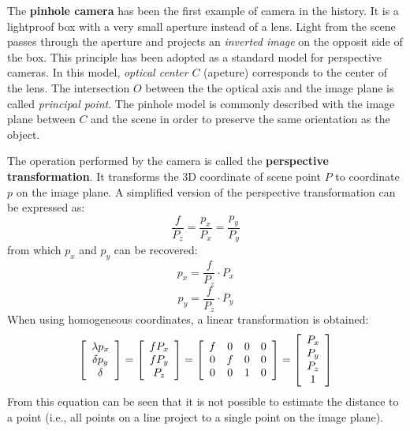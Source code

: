 {The \textbf{pinhole camera} has been the first example of camera in the history.
It is a lightproof box with a very small aperture instead of a lens.
Light from the scene passes through the aperture and projects an \textit{inverted image} on the opposit side of the box.
This principle has been adopted as a standard model for perspective cameras.
In this model, \textit{optical center} $C$ (apeture) corresponds to the center of the lens.
The intersection $O$ between the the optical axis and the image plane is called \textit{principal point}.
The pinhole model is commonly described with the image plane between $C$ and the scene in order to preserve the same orientation as the object.

The operation performed by the camera is called the \textbf{perspective transformation}.
It transforms the 3D coordinate of scene point $P$ to coordinate $p$ on the image plane.
A simplified version of the perspective transformation can be expressed as:
\begin{equation}
\frac{f}{P_z} = \frac{p_x}{P_x} = \frac{p_y}{P_y}
\end{equation}
from which $p_x$ and $p_y$ can be recovered:
\begin{equation}
p_x = \frac{f}{P_z} \cdot P_x
\end{equation}
\begin{equation}
p_y = \frac{f}{P_z} \cdot P_y
\end{equation}
When using homogeneous coordinates, a linear transformation is obtained:
\begin{equation}
\left[ \begin{array}{c}
\lambda p_x \\
\delta p_y \\
\delta
\end{array} \right]
=
\left[ \begin{array}{c}
f P_x \\
f P_y \\
P_z
\end{array} \right]
=
\left[ \begin{array}{c c c c}
f & 0 & 0 & 0  \\
0 & f & 0 & 0 \\
0 & 0 & 1 & 0
\end{array} \right]
=
\left[ \begin{array}{c}
P_x \\
P_y \\
P_z \\
1
\end{array} \right]
\end{equation}
From this equation can be seen that it is not possible to estimate the distance to a point (i.e., all points on a line project to a single point on the image plane).

}
